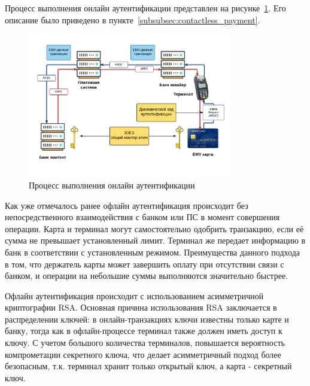 
Процесс выполнения онлайн аутентификации представлен на рисунке~\ref{fig:online_auth}.
Его описание было приведено в пункте~\ref{subsubsec:contactless_payment}.

\begin{figure}[H]
    \centering
    \includegraphics[width=0.8\textwidth]{images/research/online_auth}
    \caption{\centering Процесс выполнения онлайн аутентификации}
    \label{fig:online_auth}
\end{figure}



Как уже отмечалось ранее офлайн аутентификация происходит без непосредственного взаимодействия с банком или ПС в момент совершения операции.
Карта и терминал могут самостоятельно одобрить транзакцию, если её сумма не превышает установленный лимит.
Терминал же передает информацию в банк в соответствии с установленным режимом.
Преимущества данного подхода в том, что держатель карты может завершить оплату при отсутствии связи с банком, и операции на небольшие суммы выполняются значительно быстрее.

Офлайн аутентификация происходит с использованием асимметричной криптографии RSA.
Основная причина использования RSA заключается в распределении ключей: в онлайн-транзакциях ключи известны только карте и банку, тогда как в офлайн-процессе терминал также должен иметь доступ к ключу.
С учетом большого количества терминалов, повышается вероятность компрометации секретного ключа, что делает асимметричный подход более безопасным, т.к. терминал хранит только открытый ключ, а карта - секретный ключ.

